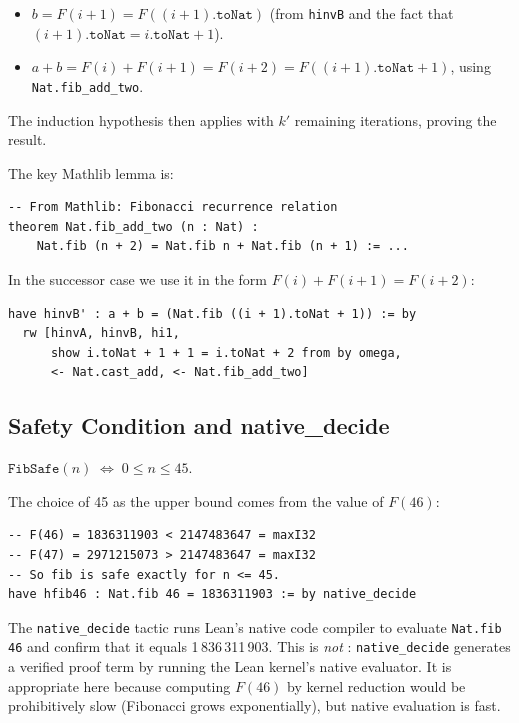 \begin{itemize}[leftmargin=1.5em]
  \item $b = F(i+1) = F((i+1).\texttt{toNat})$ (from \texttt{hinvB} and the
        fact that $(i+1).\texttt{toNat} = i.\texttt{toNat} + 1$).
  \item $a + b = F(i) + F(i+1) = F(i+2) = F((i+1).\texttt{toNat} + 1)$,
        using \texttt{Nat.fib\_add\_two}.
\end{itemize}

The induction hypothesis then applies with $k'$ remaining iterations,
proving the result.

The key Mathlib lemma is:

\begin{lstlisting}[caption={Nat.fib\_add\_two from Mathlib.},label={lst:fibrecurrence}]
-- From Mathlib: Fibonacci recurrence relation
theorem Nat.fib_add_two (n : Nat) :
    Nat.fib (n + 2) = Nat.fib n + Nat.fib (n + 1) := ...
\end{lstlisting}

In the successor case we use it in the form $F(i) + F(i+1) = F(i+2)$:

\begin{lstlisting}[caption={Using fib\_add\_two in the invariant step.},label={lst:fibstep}]
have hinvB' : a + b = (Nat.fib ((i + 1).toNat + 1)) := by
  rw [hinvA, hinvB, hi1,
      show i.toNat + 1 + 1 = i.toNat + 2 from by omega,
      <- Nat.cast_add, <- Nat.fib_add_two]
\end{lstlisting}

\subsection{Safety Condition and native\_decide}

\begin{definition}[FibSafe]
$\texttt{FibSafe}(n) \;\Leftrightarrow\; 0 \le n \le 45$.
\end{definition}

The choice of 45 as the upper bound comes from the value of $F(46)$:

\begin{lstlisting}[caption={Fibonacci bound: F(46) fits in I32.},label={lst:f46}]
-- F(46) = 1836311903 < 2147483647 = maxI32
-- F(47) = 2971215073 > 2147483647 = maxI32
-- So fib is safe exactly for n <= 45.
have hfib46 : Nat.fib 46 = 1836311903 := by native_decide
\end{lstlisting}

The \texttt{native\_decide} tactic runs Lean's native code compiler to evaluate
\texttt{Nat.fib 46} and confirm that it equals 1\,836\,311\,903. This is
\emph{not} \sorry: \texttt{native\_decide} generates a verified proof term
by running the Lean kernel's native evaluator. It is appropriate here because
computing $F(46)$ by kernel reduction would be prohibitively slow (Fibonacci
grows exponentially), but native evaluation is fast.

